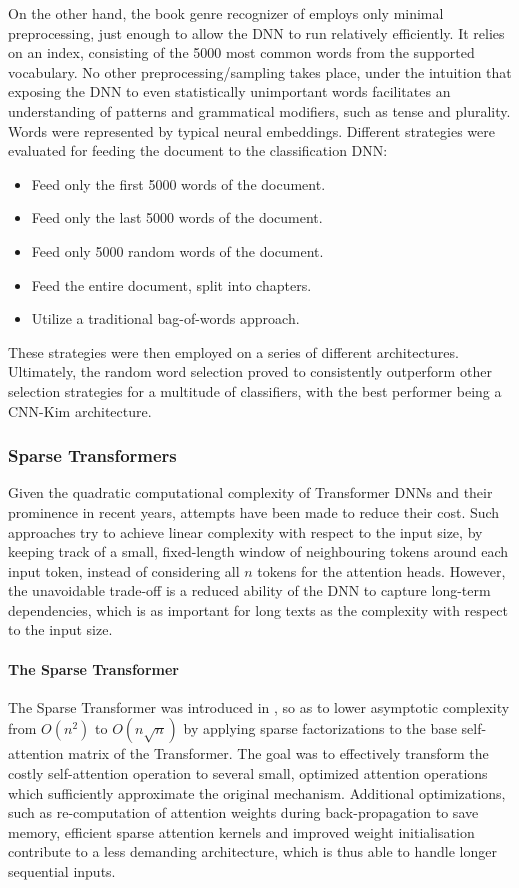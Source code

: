 \documentclass[preprint,review,12pt]{elsarticle}
\begin{document}
On the other hand, the book genre recognizer of \citet{worsham} employs only minimal preprocessing, just enough to allow the DNN to run relatively efficiently. It relies on an index, consisting of the 5000 most common words from the supported vocabulary. No other preprocessing/sampling takes place, under the intuition that exposing the DNN to even statistically unimportant words facilitates an understanding of patterns and grammatical modifiers, such as tense and plurality. Words were represented by typical neural embeddings. Different strategies were evaluated for feeding the document to the classification DNN:
\begin{itemize}
    \item Feed only the first 5000 words of the document.
    \item Feed only the last 5000 words of the document.
    \item Feed only 5000 random words of the document.
    \item Feed the entire document, split into chapters.
    \item Utilize a traditional bag-of-words approach.
\end{itemize}

These strategies were then employed on a series of different architectures. Ultimately, the random word selection proved to consistently outperform other selection strategies for a multitude of classifiers, with the best performer being a CNN-Kim \cite{kim} architecture.

\subsubsection{Sparse Transformers}

Given the quadratic computational complexity of Transformer DNNs and their prominence in recent years, attempts have been made to reduce their cost. Such approaches try to achieve linear complexity with respect to the input size, by keeping track of a small, fixed-length window of neighbouring tokens around each input token, instead of considering all $n$ tokens for the attention heads. However, the unavoidable trade-off is a reduced ability of the DNN to capture long-term dependencies, which is as important for long texts as the complexity with respect to the input size.

\paragraph{The Sparse Transformer} The Sparse Transformer was introduced in \cite{sparse_attention}, so as to lower asymptotic complexity from $O(n^2)$ to $O(n\sqrt{n})$ by applying sparse factorizations to the base self-attention matrix of the Transformer. The goal was to effectively transform the costly self-attention operation to several small, optimized attention operations which sufficiently approximate the original mechanism. Additional optimizations, such as re-computation of attention weights during back-propagation to save memory, efficient sparse attention kernels and improved weight initialisation contribute to a less demanding architecture, which is thus able to handle longer sequential inputs.
\end{document}
